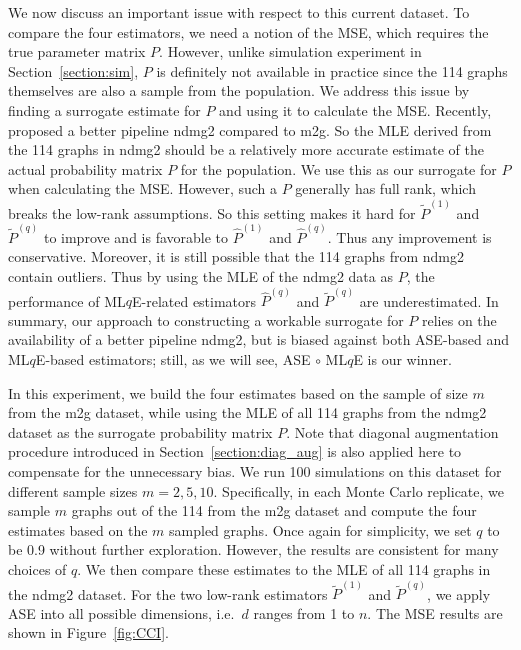 \documentclass[a4paper]{article}
\renewcommand{\hat}{\widehat}
\begin{document}
We now discuss an important issue with respect to this current dataset. To compare the four estimators, we need a notion of the MSE, which requires the true parameter matrix $P$. However, unlike simulation experiment in Section~\ref{section:sim}, $P$ is definitely not available in practice since the 114 graphs themselves are also a sample from the population. We address this issue by finding a surrogate estimate for $P$ and using it to calculate the MSE.
Recently, \citet{kiar2016ndmg} proposed a better pipeline ndmg2 compared to m2g. So the MLE derived from the 114 graphs in ndmg2 should be a relatively more accurate estimate of the actual probability matrix $P$ for the population. We use this as our surrogate for $P$ when calculating the MSE. However, such a $P$ generally has full rank, which breaks the low-rank assumptions. So this setting makes it hard for $\widetilde{P}^{(1)}$ and $\widetilde{P}^{(q)}$ to improve and is favorable to $\hat{P}^{(1)}$ and $\hat{P}^{(q)}$. Thus any improvement is conservative. Moreover, it is still possible that the 114 graphs from ndmg2 contain outliers. Thus by using the MLE of the ndmg2 data as $P$, the performance of ML$q$E-related estimators $\hat{P}^{(q)}$ and $\widetilde{P}^{(q)}$ are underestimated.
In summary, our approach to constructing a workable surrogate for $P$ relies on the availability of a better pipeline ndmg2, but is biased against both ASE-based and ML$q$E-based estimators; still, as we will see,  ASE $\circ$ ML$q$E is our winner.

In this experiment, we build the four estimates based on the sample of size $m$ from the m2g dataset, while using the MLE of all 114 graphs from the ndmg2 dataset as the surrogate probability matrix $P$. Note that diagonal augmentation procedure introduced in Section~\ref{section:diag_aug} is also applied here to compensate for the unnecessary bias.
We run 100 simulations on this dataset for different sample sizes $m = 2, 5, 10$. Specifically, in each Monte Carlo replicate, we sample $m$ graphs out of the 114 from the m2g dataset and compute the four estimates based on the $m$ sampled graphs. Once again for simplicity, we set $q$ to be 0.9 without further exploration. However, the results are consistent for many choices of $q$. We then compare these estimates to the MLE of all 114 graphs in the ndmg2 dataset.
For the two low-rank estimators $\widetilde{P}^{(1)}$ and $\widetilde{P}^{(q)}$, we apply ASE into all possible dimensions, i.e.\ $d$ ranges from 1 to $n$. The MSE results are shown in Figure~\ref{fig:CCI}.
\end{document}
